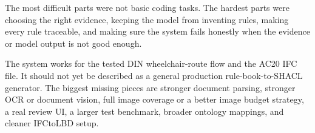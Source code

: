 \documentclass[11pt,a4paper]{article}
\begin{document}
The most difficult parts were not basic coding tasks. The hardest parts were choosing the right evidence, keeping the model from inventing rules, making every rule traceable, and making sure the system fails honestly when the evidence or model output is not good enough.

The system works for the tested DIN wheelchair-route flow and the AC20 IFC file. It should not yet be described as a general production rule-book-to-SHACL generator. The biggest missing pieces are stronger document parsing, stronger OCR or document vision, full image coverage or a better image budget strategy, a real review UI, a larger test benchmark, broader ontology mappings, and cleaner IFCtoLBD setup.
\end{document}
